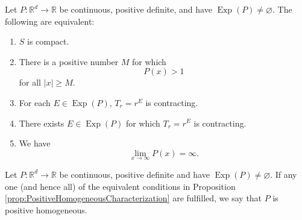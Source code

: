 \documentclass[smallextended]{svjour3}
\theoremstyle{remark}
\newcommand\Exp{\operatorname{Exp}}
\begin{document}
\begin{proposition}\label{prop:PositiveHomogeneousCharacterization}
Let $P:\mathbb{R}^d\to\mathbb{R}$ be continuous, positive definite, and have $\Exp(P)\neq \varnothing$. The following are equivalent:
\begin{enumerate}[label=(\alph*), ref=(\alph*)]
\item\label{cond:SisCompact} $S$ is compact.
\item\label{cond:PisAboveOne} There is a positive number $M$ for which
\begin{equation*}
P(x)>1
\end{equation*}
for all $|x|\geq M$. 
\item\label{cond:Contracting} For each $E\in\Exp(P)$, $T_r=r^E$ is contracting.
\item\label{cond:ThereExistsContracting} There exists $E\in\Exp(P)$ for which $T_r=r^E$ is contracting.
\item\label{cond:InfiniteLimit} We have
\begin{equation*}
\lim_{x\to\infty}P(x)=\infty.
\end{equation*}
\end{enumerate}
\end{proposition}



\begin{definition}
Let $P:\mathbb{R}^d\to\mathbb{R}$ be continuous, positive definite and have $\Exp(P)\neq \varnothing$. If any one (and hence all) of the equivalent conditions in Proposition \ref{prop:PositiveHomogeneousCharacterization} are fulfilled, we say that $P$ is positive homogeneous.
\end{definition}
\end{document}
